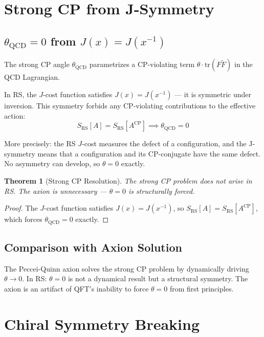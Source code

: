 \documentclass[12pt,a4paper]{article}
\newtheorem{theorem}{Theorem}[section]
\theoremstyle{definition}
\theoremstyle{remark}
\begin{document}
\section{Strong CP from J-Symmetry}

\subsection{$\theta_\mathrm{QCD} = 0$ from $J(x) = J(x^{-1})$}

The strong CP angle $\theta_\mathrm{QCD}$ parametrizes a CP-violating term 
$\theta \cdot \text{tr}(F\tilde{F})$ in the QCD Lagrangian.

In RS, the $J$-cost function satisfies $J(x) = J(x^{-1})$ — it is symmetric under 
inversion. This symmetry forbids any CP-violating contributions to the effective action:
\begin{equation}
S_\mathrm{RS}[A] = S_\mathrm{RS}[A^\mathrm{CP}] \implies \theta_\mathrm{QCD} = 0
\end{equation}

More precisely: the RS $J$-cost measures the defect of a configuration, and the 
J-symmetry means that a configuration and its CP-conjugate have the same defect. 
No asymmetry can develop, so $\theta = 0$ exactly.

\begin{theorem}[Strong CP Resolution]
The strong CP problem does not arise in RS. The axion is unnecessary ---
$\theta = 0$ is structurally forced.
\end{theorem}

\begin{proof}
The $J$-cost function satisfies $J(x) = J(x^{-1})$, so $S_\mathrm{RS}[A] = S_\mathrm{RS}[A^\mathrm{CP}]$, which forces $\theta_\mathrm{QCD} = 0$ exactly.
\end{proof}

\subsection{Comparison with Axion Solution}

The Peccei-Quinn axion solves the strong CP problem by dynamically driving $\theta \to 0$.
In RS: $\theta = 0$ is not a dynamical result but a structural symmetry. The axion 
is an artifact of QFT's inability to force $\theta = 0$ from first principles.

\section{Chiral Symmetry Breaking}
\end{document}

